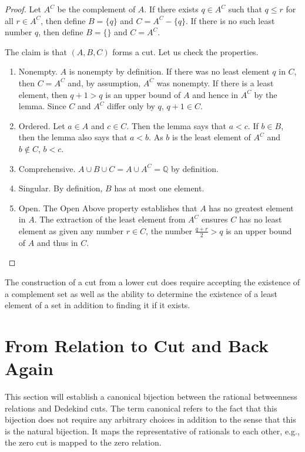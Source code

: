 \documentclass[12pt]{article}
\begin{document}
\begin{proof}
    Let $A^C$ be the complement of $A$. If there exists $q \in A^C$ such that $q \leq r$ for all $r \in A^C$, then define $B = \{q\}$ and $C = A^C - \{q\}$. If there is no such least number $q$, then define $B = \{\}$ and $C = A^C$. 

    The claim is that $(A, B, C)$ forms a cut. Let us check the properties. 

    \begin{enumerate}
        \item Nonempty. $A$ is nonempty by definition. If there was no least element $q$ in $C$, then $C = A^C$ and, by assumption, $A^C$ was nonempty. If there is a least element, then $q+1 > q$ is an upper bound of $A$ and hence in $A^C$ by the lemma. Since $C$ and $A^C$ differ only by $q$, $q+1 \in C$. 
        \item Ordered. Let $a \in A$ and $c \in C$. Then the lemma says that $ a< c$. If $b \in B$, then the lemma also says that $a < b$. As $b$ is the least element of $A^C$ and $b \notin C$, $ b < c$. 
        \item Comprehensive. $A \cup B \cup C = A \cup A^C = \mathbb{Q}$ by definition. 
        \item Singular. By definition, $B$ has at most one element. 
        \item Open. The Open Above property establishes that $A$ has no greatest element in $A$. The extraction of the least element from $A^C$ ensures $C$ has no least element as given any number $r \in C$, the number $\frac{q+r}{2} > q$ is an upper bound of $A$ and thus in $C$. 
    \end{enumerate}
\end{proof}

The construction of a cut from a lower cut does require accepting the existence of a complement set as well as the ability to determine the existence of a least element of a set in addition to finding it if it exists. 

\section{From Relation to Cut and Back Again}

This section will establish a canonical bijection between the rational betweenness relations and Dedekind cuts. The term canonical refers to the fact that this bijection does not require any arbitrary choices in addition to the sense that this is the natural bijection. It maps the representative of rationals to each other, e.g., the zero cut is mapped to the zero relation. 
\end{document}
